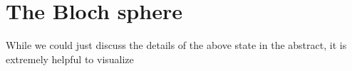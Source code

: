 \section{The Bloch sphere}

While we could just discuss the details of the above state in the abstract, it is extremely helpful to visualize 